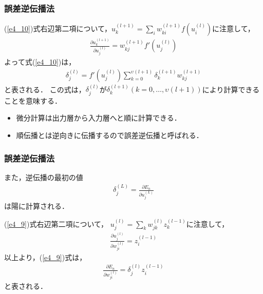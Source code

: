\documentclass[dvipdfmx]{beamer}
\newcommand{\fp}[2]{\frac{\partial #1}{\partial #2}}
\renewcommand{\d}[2]{\delta_{#1}^{(#2)}}
\renewcommand{\u}[2]{u_{#1}^{(#2)}}
\newcommand{\w}[2]{w_{#1}^{(#2)}}
\newcommand{\z}[2]{z_{#1}^{(#2)}}
\begin{document}
\begin{frame}
    \frametitle{誤差逆伝播法}
    (\ref{e4_10})式右辺第二項について，$\u{k}{l+1} = \sum_{i} \w{ki}{l+1} f(\u{i}{l})$に注意して，
    \begin{align*}
        \fp{\u{k}{l+1}}{\u{j}{l}} = \w{kj}{l+1} f'(\u{j}{l})
    \end{align*}
    よって式(\ref{e4_10})は，
    \begin{align}
        \d{j}{l} = f'(\u{j}{l}) \sum_{k=0}^{\upsilon(l+1)} \d{k}{l+1} \w{kj}{l+1}  \label{e4_12}
    \end{align}
    と表される．
    この式は，$\d{j}{l}$が$\d{k}{l+1} (k = 0, \ldots , \upsilon(l+1))$により計算できることを意味する．

    \begin{itemize}
        \item 微分計算は出力層から入力層へと順に計算できる．
        \item 順伝播とは逆向きに伝播するので誤差逆伝播と呼ばれる．
    \end{itemize}
\end{frame}


\begin{frame}
    \frametitle{誤差逆伝播法}
    また，逆伝播の最初の値
    \begin{align*}
        \d{j}{L} = \fp{E_n}{\u{j}{L}}
    \end{align*}
    は陽に計算される．

    (\ref{e4_9})式右辺第二項について，
    $\u{j}{l} = \sum_{k} \w{jk}{l} \z{k}{l-1}$に注意して，
    \begin{align*}
        \fp{\u{j}{l}}{\w{ji}{l}} = \z{i}{l-1}
    \end{align*}
    以上より，(\ref{e4_9})式は，
    \begin{align}
        \fp{E_n}{\w{ji}{l}} = \d{j}{l} \z{i}{l-1}  \label{e4_13}
    \end{align}
    と表される．
\end{frame}
\end{document}
